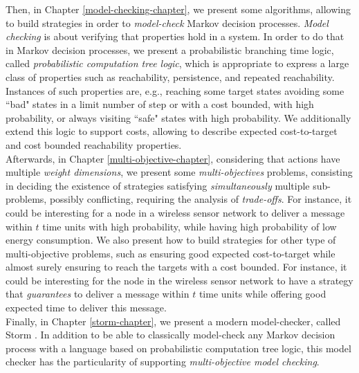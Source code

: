 Then, in Chapter \ref{model-checking-chapter}, we present some algorithms, allowing to build strategies in order to \textit{model-check} Markov decision processes.
\textit{Model checking} is about verifying that properties hold in a system.
In order to do that in Markov decision processes, we present a probabilistic branching time logic, called \textit{probabilistic computation tree logic}, which is appropriate to express a large class of properties such as reachability, persistence, and repeated reachability.
Instances of such properties are, e.g.,
reaching some target states avoiding some ``bad" states in a limit number of step or with a cost bounded, with high probability, or always visiting ``safe" states with high probability.
We additionally extend this logic to support costs, allowing to describe expected cost-to-target and cost bounded reachability properties.\\

Afterwards, in Chapter \ref{multi-objective-chapter}, considering that actions have multiple \textit{weight dimensions},
we present some \textit{multi-objectives} problems, consisting in deciding the existence of strategies satisfying \textit{simultaneously} multiple sub-problems, possibly conflicting, requiring the analysis of \textit{trade-offs}.
For instance, it could be interesting for a node in a wireless sensor network to deliver a message within $t$ time units with high probability, while having high probability of low energy consumption.
We also present how to build strategies for other type of multi-objective problems, such as ensuring good expected cost-to-target while almost surely ensuring to reach the targets with a cost bounded.
For instance, it could be interesting for the node in the wireless sensor network to have a strategy that \textit{guarantees} to deliver a message within $t$ time units while offering good expected time to deliver this message.\\

Finally, in Chapter \ref{storm-chapter}, we present a modern model-checker, called Storm \cite{storm1}.
In addition to be able to classically model-check any Markov decision process with a language based on probabilistic computation tree logic,
this model checker has the particularity of supporting \textit{multi-objective model checking}.
